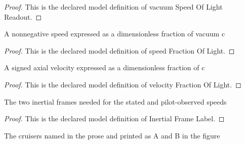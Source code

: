 \begin{proof}
  This is the declared model definition of vacuum Speed Of Light Readout.
\end{proof}
\begin{definition}
  \label{def:physics:phyx-mini-0589:phyxminiproblems-problemphyxmini0589-speedfractionoflight}
  A nonnegative speed expressed as a dimensionless fraction of vacuum c
\end{definition}
\begin{proof}
  This is the declared model definition of speed Fraction Of Light.
\end{proof}
\begin{definition}
  \label{def:physics:phyx-mini-0589:phyxminiproblems-problemphyxmini0589-velocityfractionoflight}
  A signed axial velocity expressed as a dimensionless fraction of c
\end{definition}
\begin{proof}
  This is the declared model definition of velocity Fraction Of Light.
\end{proof}
\begin{definition}
  \label{def:physics:phyx-mini-0589:phyxminiproblems-problemphyxmini0589-inertialframelabel}
  The two inertial frames needed for the stated and pilot-observed speeds
\end{definition}
\begin{proof}
  This is the declared model definition of Inertial Frame Label.
\end{proof}
\begin{definition}
  \label{def:physics:phyx-mini-0589:phyxminiproblems-problemphyxmini0589-cruiserlabel}
  The cruisers named in the prose and printed as A and B in the figure
\end{definition}
